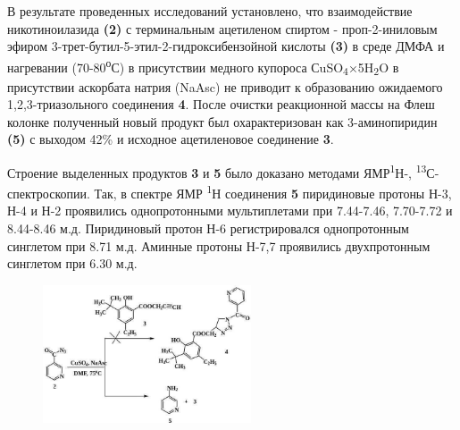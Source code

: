 \begin{multicols}{2}
В результате проведенных исследований установлено, что взаимодействие
никотиноилазида {\bfseries (2)} с терминальным ацетиленом спиртом -
проп-2-иниловым эфиром 3-трет-бутил-5-этил-2-гидроксибензойной кислоты
{\bfseries (3)} в среде ДМФА и нагревании (70-80\textsuperscript{о}С) в
присутствии медного купороса СuSO\textsubscript{4}×5H\textsubscript{2}O
в присутствии аскорбата натрия (NaAsc) не приводит к образованию
ожидаемого 1,2,3-триазольного соединения {\bfseries 4}. После очистки
реакционной массы на Флеш колонке полученный новый продукт был
охарактеризован как 3-аминопиридин {\bfseries (5)} с выходом 42\% и
исходное ацетиленовое соединение {\bfseries 3}.

Строение выделенных продуктов {\bfseries 3} и {\bfseries 5} было доказано
методами ЯМР\textsuperscript{1}Н-, \textsuperscript{13}С- спектроскопии.
Так, в спектре ЯМР \textsuperscript{1}Н соединения {\bfseries 5}
пиридиновые протоны Н-3, Н-4 и Н-2 проявились однопротонными
мультиплетами при 7.44-7.46, 7.70-7.72 и 8.44-8.46 м.д. Пиридиновый
протон Н-6 регистрировался однопротонным синглетом при 8.71 м.д. Аминные
протоны Н-7,7 проявились двухпротонным синглетом при 6.30 м.д.
\end{multicols}

\begin{figure}[H]
	\centering
	\includegraphics[width=0.55\textwidth]{assets/3}
\end{figure}

